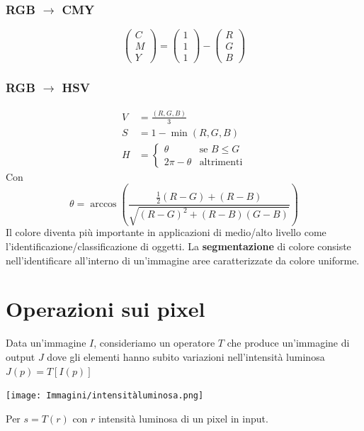 \documentclass[12pt, a4paper]{report}
\begin{document}
\subsubsection{RGB $\rightarrow$ CMY}
\begin{equation*}
    \begin{pmatrix}
        C \\
        M \\
        Y
    \end{pmatrix} = \begin{pmatrix}
        1 \\
        1 \\
        1
    \end{pmatrix} - \begin{pmatrix}
        R \\
        G \\
        B
    \end{pmatrix}
\end{equation*}
\subsubsection{RGB $\rightarrow$ HSV}
\begin{equation*}
    \begin{split}
        V &= \frac{(R,G,B)}{3} \\
        S &= 1 - \min(R,G,B) \\
        H &= \begin{cases}
            \theta & \text{se } B \leq G \\
            2\pi - \theta & \text{altrimenti}
        \end{cases}
    \end{split}
\end{equation*}
Con \begin{equation*}
    \theta = \arccos\left(\frac{\frac{1}{2}(R-G)+(R-B)}{\sqrt{(R-G)^{2}+(R-B)(G-B)}}\right)
\end{equation*}
Il colore diventa più importante in applicazioni di medio/alto livello come l'identificazione/classificazione di oggetti. La \textbf{segmentazione} di colore consiste nell'identificare all'interno di un'immagine aree caratterizzate  da colore uniforme.
\section{Operazioni sui pixel}
Data un'immagine $I$, consideriamo un operatore $T$ che produce un'immagine di output $J$ dove gli elementi hanno subito variazioni nell'intensità luminosa $J(p) = T[I(p)]$
\begin{center}
    \texttt{[image: Immagini/intensitàluminosa.png]}
\end{center}
Per $s=T(r)$ con $r$ intensità luminosa di un pixel in input.
\end{document}
